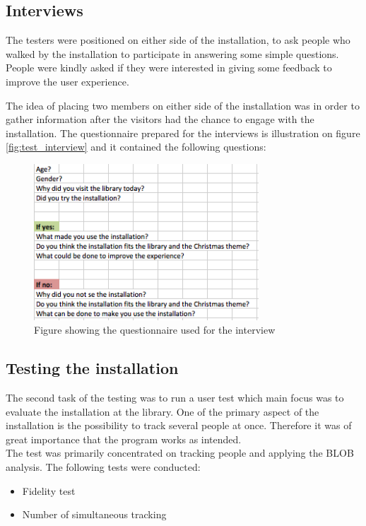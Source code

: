 \subsection{Interviews}
The testers were positioned on either side of the installation, to ask people who walked by the installation to participate in answering some simple questions. People were kindly asked if they were interested in giving some feedback to improve the user experience.

The idea of placing two members on either side of the installation was in order to gather information after the visitors had the chance to engage with the installation. The questionnaire prepared for the interviews is illustration on figure \eqref{fig:test_interview} and it contained the following questions:

\begin{figure}[H] 
\centering 
\includegraphics[width=0.75\textwidth]{Pictures/Test/Interview.png} 
\caption{Figure showing the questionnaire used for the interview} 
\label{fig:test_interview} 
\end{figure}

\subsection{Testing the installation}
The second task of the testing was to run a user test which main focus was to evaluate the installation at the library. One of the primary aspect of the installation is the possibility to track several people at once. Therefore it was of great importance that the program works as intended.\\
The test was primarily concentrated on tracking people and applying the BLOB analysis. The following tests were conducted: 
\begin{itemize}
\item Fidelity test
\item Number of simultaneous tracking
\end{itemize}

